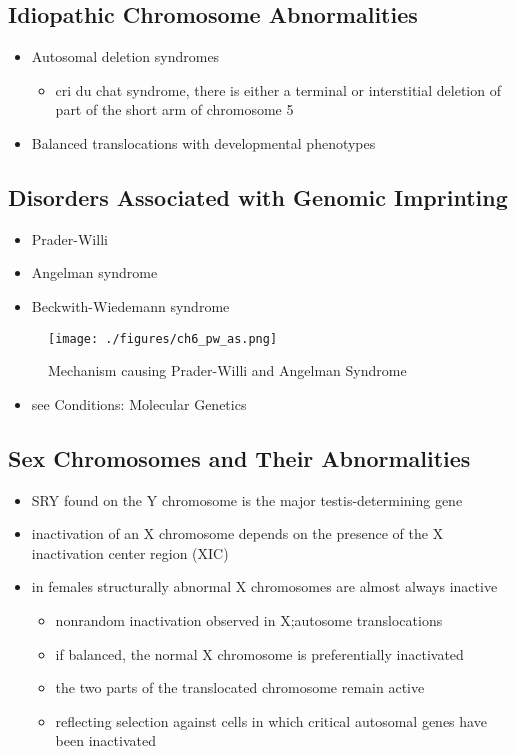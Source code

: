\documentclass[12pt]{scrartcl}
\begin{document}
\subsection{Idiopathic Chromosome Abnormalities}
\label{sec:org7d7682d}
\begin{itemize}
\item Autosomal deletion syndromes
\begin{itemize}
\item cri du chat syndrome, there is either a terminal or interstitial
deletion of part of the short arm of chromosome 5
\end{itemize}
\item Balanced translocations with developmental phenotypes
\end{itemize}

\subsection{Disorders Associated with Genomic Imprinting}
\label{sec:org01f6eae}
\begin{itemize}
\item Prader-Willi
\item Angelman syndrome
\item Beckwith-Wiedemann syndrome
\end{itemize}

\begin{figure}[htbp]
\centering
\texttt{[image: ./figures/ch6\_pw\_as.png]}
\caption{\label{fig:org4e5b746}Mechanism causing Prader-Willi and Angelman Syndrome}
\end{figure}

\begin{itemize}
\item see Conditions: Molecular Genetics
\end{itemize}

\subsection{Sex Chromosomes and Their Abnormalities}
\label{sec:org143ca89}
\begin{itemize}
\item SRY found on the Y chromosome is the major testis-determining gene
\item inactivation of an X chromosome depends on the presence of the X
inactivation center region (XIC)
\item in females structurally abnormal X chromosomes are almost always inactive
\begin{itemize}
\item nonrandom inactivation observed in X;autosome translocations
\item if balanced, the normal X chromosome is preferentially
inactivated
\item the two parts of the translocated chromosome remain active
\item reflecting selection against cells in which critical autosomal
genes have been inactivated
\end{itemize}
\end{itemize}
\end{document}
